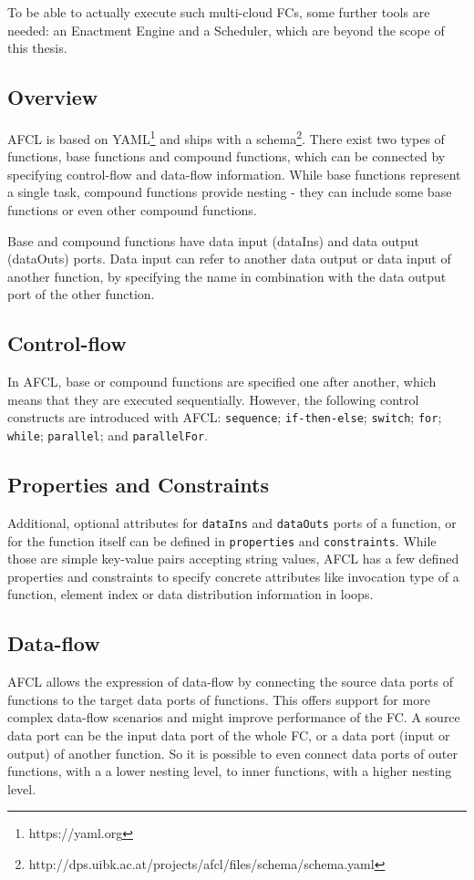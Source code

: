\documentclass[a4paper,top=25mm,bottom=25mm,12pt,pdftex,halfparskip,twoside,openany,bibtotoc,numbers=noenddot]{scrbook}
\begin{document}
To be able to actually execute such multi-cloud FCs, some further tools are needed: an Enactment Engine and a Scheduler, which are beyond the scope of this thesis.

\subsection{Overview}
AFCL is based on YAML\footnote{https://yaml.org} and ships with a schema\footnote{http://dps.uibk.ac.at/projects/afcl/files/schema/schema.yaml}. There exist two types of functions, base functions and compound functions, which can be connected by specifying control-flow and data-flow information. While base functions represent a single task, compound functions provide nesting - they can include some base functions or even other compound functions.

Base and compound functions have data input (dataIns) and data output (dataOuts) ports.
Data input can refer to another data output or data input of another function, by specifying the name in combination with the data output port of the other function.

\subsection{Control-flow}
In AFCL, base or compound functions are specified one after another, which means that they are executed sequentially. However, the following control constructs are introduced with AFCL: \texttt{sequence}; \texttt{if-then-else}; \texttt{switch}; \texttt{for}; \texttt{while}; \texttt{parallel}; and \texttt{parallelFor}.


\subsection{Properties and Constraints}

Additional, optional attributes for \texttt{dataIns} and \texttt{dataOuts} ports of a function, or for the function itself can be defined in \texttt{properties} and \texttt{constraints}. While those are simple key-value pairs accepting string values, AFCL has a few defined properties and constraints to specify concrete attributes like invocation type of a function, element index or data distribution information in loops.

\subsection{Data-flow}
AFCL allows the expression of data-flow by connecting the source data ports of functions to the target data ports of functions. This offers support for more complex data-flow scenarios and might improve performance of the FC. A source data port can be the input data port of the whole FC, or a data port (input or output) of another function. So it is possible to even connect data ports of outer functions, with a a lower nesting level, to inner functions, with a higher nesting level. 
\end{document}
